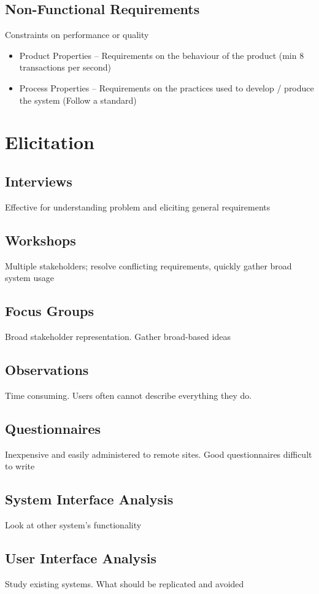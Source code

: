 \documentclass[10pt,a4paper]{article}
\begin{document}
\begin{landscape}
\begin{multicols}{3}
\subsection{Non-Functional Requirements}
Constraints on performance or quality
\begin{itemize}
    \item Product Properties -- Requirements on the behaviour of the product (min 8 transactions per second)
    \item Process Properties -- Requirements on the practices used to develop / produce the system (Follow a standard)
\end{itemize}

\section{Elicitation}
\subsection{Interviews}
Effective for understanding problem and eliciting general requirements
\subsection{Workshops}
Multiple stakeholders; resolve conflicting requirements, quickly gather broad system usage
\subsection{Focus Groups}
Broad stakeholder representation. Gather broad-based ideas
\subsection{Observations}
Time consuming. Users often cannot describe everything they do.
\subsection{Questionnaires}
Inexpensive and easily administered to remote sites. Good questionnaires difficult to write
\subsection{System Interface Analysis}
Look at other system's functionality
\subsection{User Interface Analysis}
Study existing systems. What should be replicated and avoided

\end{multicols}
\end{landscape}
\end{document}
